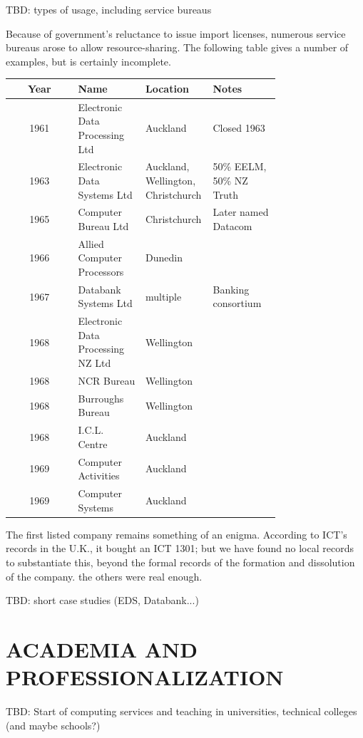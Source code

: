 \documentclass{IEEEcsmag}
\begin{document}
TBD: types of usage, including service bureaus

Because of government's reluctance to issue import licenses, numerous service bureaus arose to allow resource-sharing. The following table gives a number of examples, but is certainly incomplete.

\begin{center}
\begin{tabular}{ |c|p{0.25\linewidth}|p{0.25\linewidth}|p{0.25\linewidth}| } 
 \hline
 Year & Name & Location & Notes\\ 
\hline
1961 & Electronic Data Processing Ltd & Auckland & Closed 1963\\\hline
1963 & Electronic Data Systems Ltd & Auckland, Wellington, Christchurch & 50\% EELM, 50\% NZ Truth\\\hline 
1965 & Computer Bureau Ltd & Christchurch & Later named Datacom\\\hline
1966 & Allied Computer Processors & Dunedin & \\\hline
1967 & Databank Systems Ltd & multiple & Banking consortium\\\hline
1968 & Electronic Data Processing NZ Ltd& Wellington&\\\hline
1968 & NCR Bureau & Wellington &\\\hline
1968 & Burroughs Bureau & Wellington &\\\hline
1968 & I.C.L. Centre& Auckland&\\\hline
1969 & Computer Activities& Auckland&\\\hline
1969 & Computer Systems& Auckland&\\
 \hline
\end{tabular}
\end{center}

The first listed company remains something of an enigma. According to ICT's records in the U.K., it bought an ICT 1301; but we have found no local records to substantiate this, beyond the formal records of the formation and dissolution of the company. the others were real enough.

TBD: short case studies (EDS, Databank...)

\vspace*{-8pt}
\section{ACADEMIA AND PROFESSIONALIZATION}

TBD: Start of computing services and teaching in universities, technical colleges (and maybe schools?)
\end{document}
